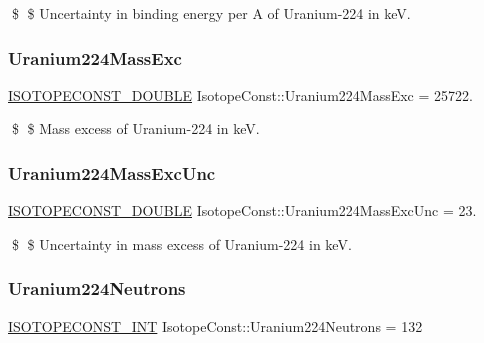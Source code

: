 \$ \$ Uncertainty in binding energy per A of Uranium-\/224 in keV. \mbox{\label{group___isotope_const-_uranium-_u224_ga97b5d536627707eeee9f38a676d9a6b8}} 
\subsubsection{\texorpdfstring{Uranium224\+Mass\+Exc}{Uranium224MassExc}}
{\footnotesize\ttfamily \mbox{\hyperlink{group___isotope_const-_macros_ga8f45a7272ce02c0b4c65c44636ed719a}{I\+S\+O\+T\+O\+P\+E\+C\+O\+N\+S\+T\+\_\+\+D\+O\+U\+B\+LE}} Isotope\+Const\+::\+Uranium224\+Mass\+Exc = 25722.}

\$ \$ Mass excess of Uranium-\/224 in keV. \mbox{\label{group___isotope_const-_uranium-_u224_gabce27a9089dfb90add5a97b2c341d991}} 
\subsubsection{\texorpdfstring{Uranium224\+Mass\+Exc\+Unc}{Uranium224MassExcUnc}}
{\footnotesize\ttfamily \mbox{\hyperlink{group___isotope_const-_macros_ga8f45a7272ce02c0b4c65c44636ed719a}{I\+S\+O\+T\+O\+P\+E\+C\+O\+N\+S\+T\+\_\+\+D\+O\+U\+B\+LE}} Isotope\+Const\+::\+Uranium224\+Mass\+Exc\+Unc = 23.}

\$ \$ Uncertainty in mass excess of Uranium-\/224 in keV. \mbox{\label{group___isotope_const-_uranium-_u224_ga961eb9d36cb4e22532a6be5b528929cb}} 
\subsubsection{\texorpdfstring{Uranium224\+Neutrons}{Uranium224Neutrons}}
{\footnotesize\ttfamily \mbox{\hyperlink{group___isotope_const-_macros_ga5f18360b3e99483a35c32d789e62621c}{I\+S\+O\+T\+O\+P\+E\+C\+O\+N\+S\+T\+\_\+\+I\+NT}} Isotope\+Const\+::\+Uranium224\+Neutrons = 132}

